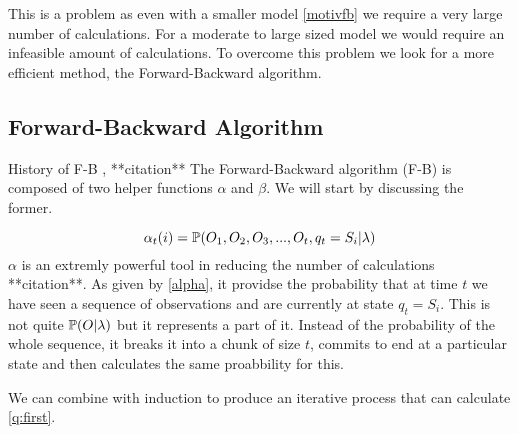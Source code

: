 This is a problem as even with a smaller model \ref{motivfb} we require a very large number of calculations. For a moderate to large sized model we would require an infeasible amount of calculations. To overcome this problem we look for a more efficient method, the Forward-Backward algorithm.



\subsection{Forward-Backward Algorithm}
History of F-B , **citation**
The Forward-Backward algorithm (F-B) is composed of two helper functions $\alpha$ and $\beta$. We will start by discussing the former.

\begin{equation}
    \label{alpha}
    \alpha_t(i) = \mathbb{P} (O_1,O_2,O_3,...,O_t,q_t=S_i | \lambda)
\end{equation}
$\alpha$ is an extremly powerful tool in reducing the number of calculations  **citation**. As given by \ref{alpha}, it providse the probability that at time $t$ we have seen a sequence of observations and are currently at state $q_t=S_i$. This is not quite $\mathbb{P} (O | \lambda)$ but it represents a part of it. Instead of the probability of the whole sequence, it breaks it into a chunk of size $t$, commits to end at a particular state and then calculates the same proabbility for this.

We can combine \label{alpha} with induction to produce an iterative process that can calculate \ref{q:first}.


